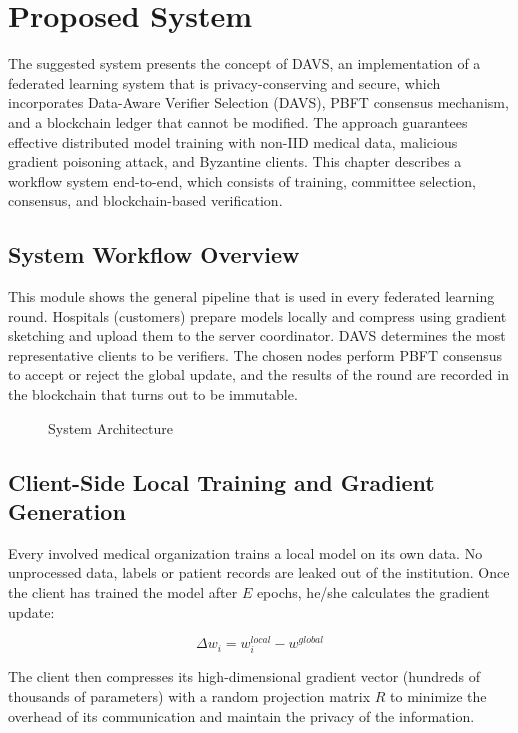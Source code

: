 \documentclass[12pt,a4paper]{article}
\begin{document}
\section{Proposed System}
The suggested system presents the concept of DAVS, an implementation of a federated learning system that is privacy-conserving and secure, which incorporates Data-Aware Verifier Selection (DAVS), PBFT consensus mechanism, and a blockchain ledger that cannot be modified. The approach guarantees effective distributed model training with non-IID medical data, malicious gradient poisoning attack, and Byzantine clients. This chapter describes a workflow system end-to-end, which consists of training, committee selection, consensus, and blockchain-based verification.

\subsection{System Workflow Overview}
This module shows the general pipeline that is used in every federated learning round. Hospitals (customers) prepare models locally and compress using gradient sketching and upload them to the server coordinator. DAVS determines the most representative clients to be verifiers. The chosen nodes perform PBFT consensus to accept or reject the global update, and the results of the round are recorded in the blockchain that turns out to be immutable.

\begin{figure}[h]
    \centering
    \fbox{\rule{0pt}{2in} \rule{0.9\linewidth}{0pt}}
    \caption{System Architecture}
\end{figure}

\subsection{Client-Side Local Training and Gradient Generation}
Every involved medical organization trains a local model on its own data. No unprocessed data, labels or patient records are leaked out of the institution. Once the client has trained the model after $E$ epochs, he/she calculates the gradient update:

\begin{equation}
    \Delta w_i = w_i^{local} - w^{global}
\end{equation}

The client then compresses its high-dimensional gradient vector (hundreds of thousands of parameters) with a random projection matrix $R$ to minimize the overhead of its communication and maintain the privacy of the information.
\end{document}
